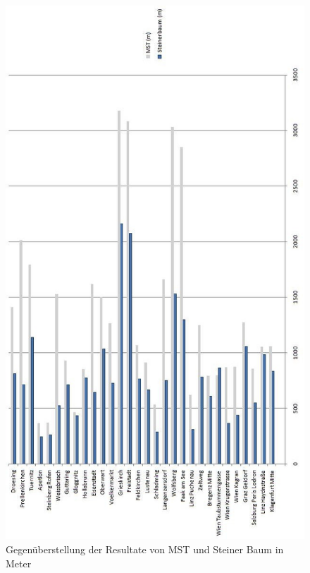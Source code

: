 \begin{figure}[H]
    \centerline{\includegraphics[scale=0.8]{pics/final_mst-steiner}}
    \caption[Gegenüberstellung der Resultate von MST und Steiner Baum]{\label{FiG:Gegenüberstellung der Resultate von MST und Steiner Baum} Gegenüberstellung der Resultate von MST und Steiner Baum in Meter}
\end{figure}

\vspace{1cm}

